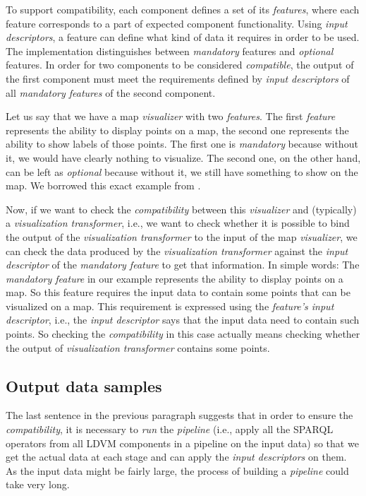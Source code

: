 To support compatibility, each component defines a set of its \emph{features}, where each feature corresponds to a part of expected component functionality. Using \emph{input descriptors}, a feature can define what kind of data it requires in order to be used. The implementation distinguishes between \emph{mandatory} features and \emph{optional} features. In order for two components to be considered \emph{compatible}, the output of the first component must meet the requirements defined by \emph{input descriptors} of all \emph{mandatory features} of the second component.

Let us say that we have a map \emph{visualizer} with two \emph{features}. The first \emph{feature} represents the ability to display points on a map, the second one represents the ability to show labels of those points. The first one is \emph{mandatory} because without it,  we would have clearly nothing to visualize. The second one, on the other hand, can be left as \emph{optional} because without it, we still have something to show on the map. We borrowed this exact example from \cite{ldvm_use_cases}. 

Now, if we want to check the \emph{compatibility} between this \emph{visualizer} and (typically) a \emph{visualization transformer}, i.e., we want to check whether it is possible to bind the output of the \emph{visualization transformer} to the input of the map \emph{visualizer}, we can check the data produced by the \emph{visualization transformer} against the \emph{input descriptor} of the \emph{mandatory feature} to get that information. In simple words: The \emph{mandatory feature} in our example represents the ability to display points on a map. So this feature requires the input data to contain some points that can be visualized on a map. This requirement is expressed using the \emph{feature's input descriptor}, i.e., the \emph{input descriptor} says that the input data need to contain such points. So checking the \emph{compatibility} in this case actually means checking whether the output of \emph{visualization transformer} contains some points.

\subsection{Output data samples}

The last sentence in the previous paragraph suggests that in order to ensure the \emph{compatibility}, it is necessary to \emph{run} the \emph{pipeline} (i.e., apply all the SPARQL operators from all LDVM components in a pipeline on the input data) so that we get the actual data at each stage and can apply the \emph{input descriptors} on them. As the input data might be fairly large, the process of building a \emph{pipeline} could take very long.


